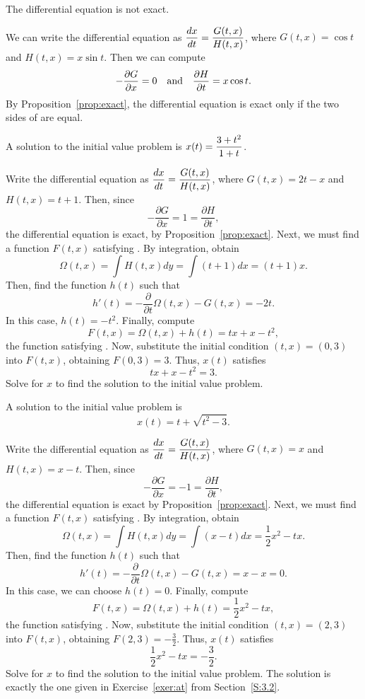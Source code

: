 \documentclass{ximera}
\begin{document}
 \ans The differential equation is not exact.

\soln We can write the differential equation as $\displaystyle\frac{dx}{dt} =
\frac{G(t,x)}{H(t,x)}$, where $G(t,x) = \cos t$ and $H(t,x) = x\sin t$. 
Then we can compute
\[
-\frac{\partial G}{\partial x} = 0 \quad\mbox{and}\quad
\frac{\partial H}{\partial t} = x\cos t.
\]
By Proposition~\ref{prop:exact}, the differential equation is exact only
if the two sides of  are equal.

 \ans A solution to the initial value problem is
$x(t) = \displaystyle\frac{3 + t^2}{1 + t}$.

\soln Write the differential equation as $\displaystyle\frac{dx}{dt} =
\frac{G(t,x)}{H(t,x)}$, where $G(t,x) = 2t - x$ and $H(t,x) = t + 1$.  Then,
since
\[
-\frac{\partial G}{\partial x} = 1 = \frac{\partial H}{\partial t},
\]
the differential equation is exact, by
Proposition~\ref{prop:exact}.  Next, we must find a function $F(t,x)$
satisfying .  By integration, obtain
\[
\Omega(t,x) = \int H(t,x)dy = \int (t + 1)dx = (t + 1)x.
\]
Then, find the function $h(t)$ such that
\[
h'(t) = -\frac{\partial}{\partial t}\Omega(t,x) - G(t,x)
= -2t.
\]
In this case, $h(t) = -t^2$.  Finally, compute
\[
F(t,x) = \Omega(t,x) + h(t) = tx + x - t^2,
\]
the function satisfying .  Now, substitute the initial
condition $(t,x) = (0,3)$ into $F(t,x)$, obtaining $F(0,3) = 3$.  Thus,
$x(t)$ satisfies
\[
tx + x - t^2 = 3.
\]
Solve for $x$ to find the solution to the initial value problem.

 \ans A solution to the initial value problem is
\[
x(t) = t + \sqrt{t^2-3}.
\]

\soln Write the differential equation as $\displaystyle\frac{dx}{dt} =
\frac{G(t,x)}{H(t,x)}$, where $G(t,x) = x$ and $H(t,x) = x - t$.  Then,
since
\[
-\frac{\partial G}{\partial x} = -1 = \frac{\partial H}{\partial t},
\]
the differential equation is exact by Proposition~\ref{prop:exact}.  Next,
we must find a function $F(t,x)$ satisfying .  By integration,
obtain
\[
\Omega(t,x) = \int H(t,x)dy = \int (x - t)dx = \frac{1}{2}x^2 -tx.
\]
Then, find the function $h(t)$ such that
\[
h'(t) = -\frac{\partial}{\partial t}\Omega(t,x) - G(t,x)
= x - x = 0 .
\]
In this case, we can choose $h(t) = 0$.  Finally, compute
\[
F(t,x) = \Omega(t,x) + h(t) =  \frac{1}{2}x^2 -tx,
\]
the function satisfying .  Now, substitute the initial
condition $(t,x) = (2,3)$ into $F(t,x)$, obtaining $F(2,3) = -\frac{3}{2}$.  Thus,
$x(t)$ satisfies
\[
 \frac{1}{2}x^2 -tx = -\frac{3}{2}.
\]
Solve for $x$ to find the solution to the initial value problem.  The
solution is exactly the one given in Exercise~\ref{exer:at} from
Section~\ref{S:3.2}.
\end{document}
